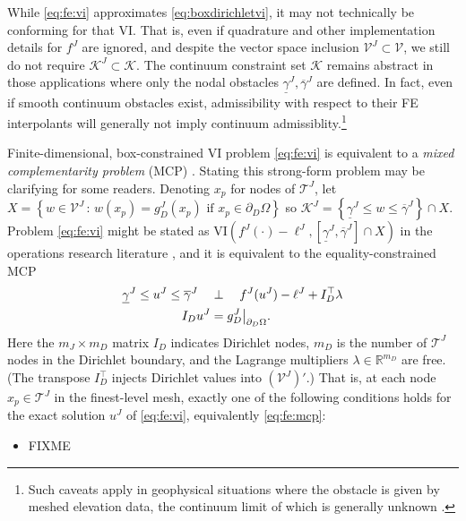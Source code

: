 \documentclass[letterpaper,final,12pt,reqno]{amsart}
\theoremstyle{cstyle}
\theoremstyle{cstyle*}
\theoremstyle{dstyle}
\numberwithin{equation}{section}
\numberwithin{figure}{section}
\numberwithin{table}{section}
\numberwithin{theorem}{section}
\newcommand{\RR}{\mathbb{R}}
\newcommand{\cK}{\mathcal{K}}
\newcommand{\cV}{\mathcal{V}}
\begin{document}
While \eqref{eq:fe:vi} approximates \eqref{eq:boxdirichletvi}, it may not technically be conforming for that VI.  That is, even if quadrature and other implementation details for $f^J$ are ignored, and despite the vector space inclusion $\mathcal{V}^J \subset \mathcal{V}$, we still do not require $\mathcal{K}^J \subset \mathcal{K}$.  The continuum constraint set $\mathcal{K}$ remains abstract in those applications where only the nodal obstacles $\underline{\gamma}^J, \overline{\gamma}^J$ are defined.  In fact, even if smooth continuum obstacles exist, admissibility with respect to their FE interpolants will generally not imply continuum admissiblity.\footnote{Such caveats apply in geophysical situations where the obstacle is given by meshed elevation data, the continuum limit of which is generally unknown \cite{Bueler2016}.}

Finite-dimensional, box-constrained VI problem \eqref{eq:fe:vi} is equivalent to a \emph{mixed complementarity problem} (MCP) \cite{FacchineiPang2003,FerrisPang1997}.  Stating this strong-form problem may be clarifying for some readers.  Denoting $x_p$ for nodes of $\mathcal{T}^J$, let $X=\left\{w\in\cV^J\,:\,w(x_p)=g_D^J(x_p) \text{ if } x_p\in \partial_D\Omega\right\}$ so $\cK^J = \left\{\underline{\gamma}^J \le w \le \overline{\gamma}^J\right\} \cap X$.  Problem \eqref{eq:fe:vi} might be stated as VI$\left(f^J(\cdot)-\ell^J,\left[\underline{\gamma}^J,\overline{\gamma}^J\right] \cap X\right)$ in the operations research literature \cite{FerrisPang1997}, and it is equivalent to the equality-constrained MCP
\begin{align}
\underline{\gamma}^J \le u^J \le \overline{\gamma}^J \quad &\perp \quad f^J(u^J) - \ell^J + I_D^\top \lambda \label{eq:fe:mcp} \\
I_D u^J &= g_D^J\big|_{\partial_D\Omega}. \notag
\end{align}
Here the $m_J\times m_D$ matrix $I_D$ indicates Dirichlet nodes, $m_D$ is the number of $\mathcal{T}^J$ nodes in the Dirichlet boundary, and the Lagrange multipliers $\lambda \in \RR^{m_D}$ are free.  (The transpose $I_D^\top$ injects Dirichlet values into $(\mathcal{V}^J)'$.)  That is, at each node $x_p \in \mathcal{T}^J$ in the finest-level mesh, exactly one of the following conditions holds for the exact solution $u^J$ of \eqref{eq:fe:vi}, equivalently \eqref{eq:fe:mcp}:
\begin{itemize}
\item FIXME
\end{itemize}
\end{document}
